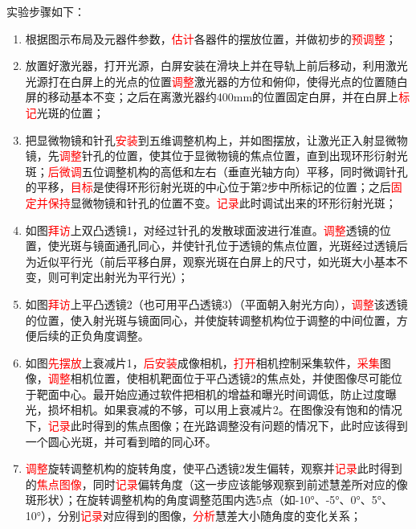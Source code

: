 \documentclass[dvipsnames, svgnames,a4paper,11pt]{article}
\begin{document}
	实验步骤如下：
	\begin{enumerate}
		\item 根据图示布局及元器件参数，\textcolor{red}{估计}各器件的摆放位置，并做初步的\textcolor{red}{预调整}；
		\item 放置好激光器，打开光源，白屏安装在滑块上并在导轨上前后移动，利用激光光源打在白屏上的光点的位置\textcolor{red}{调整}激光器的方位和俯仰，使得光点的位置随白屏的移动基本不变；之后在离激光器约400mm的位置固定白屏，并在白屏上\textcolor{red}{标记}光斑的位置；
		\item 	把显微物镜和针孔\textcolor{red}{安装}到五维调整机构上，并如图摆放，让激光正入射显微物镜，先\textcolor{red}{调整}针孔的位置，使其位于显微物镜的焦点位置，直到出现环形衍射光斑；\textcolor{red}{后微调}五位调整机构的高低和左右（垂直光轴方向）平移，同时微调针孔的平移，\textcolor{red}{目标}是使得环形衍射光斑的中心位于第2步中所标记的位置；之后\textcolor{red}{固定并保持}显微物镜和针孔的位置不变。\textcolor{red}{记录}此时调试出来的环形衍射光斑；
		\item 如图\textcolor{red}{拜访}上双凸透镜1，对经过针孔的发散球面波进行准直。\textcolor{red}{调整}透镜的位置，使光斑与镜面通孔同心，并使针孔位于透镜的焦点位置，光斑经过透镜后为近似平行光（前后平移白屏，观察光斑在白屏上的尺寸，如光斑大小基本不变，则可判定出射光为平行光）；
		\item 如图\textcolor{red}{拜访}上平凸透镜2（也可用平凸透镜3）（平面朝入射光方向），\textcolor{red}{调整}该透镜的位置，使入射光斑与镜面同心，并使旋转调整机构位于调整的中间位置，方便后续的正负角度调整。
		\item 如图\textcolor{red}{先摆放}上衰减片1，\textcolor{red}{后安装}成像相机，\textcolor{red}{打开}相机控制采集软件，\textcolor{red}{采集}图像，\textcolor{red}{调整}相机位置，使相机靶面位于平凸透镜2的焦点处，并使图像尽可能位于靶面中心。最开始应通过软件把相机的增益和曝光时间调低，防止过度曝光，损坏相机。如果衰减的不够，可以用上衰减片2。在图像没有饱和的情况下，\textcolor{red}{记录}此时得到的焦点图像；在光路调整没有问题的情况下，此时应该得到一个圆心光斑，并可看到暗的同心环。
		\item \textcolor{red}{调整}旋转调整机构的旋转角度，使平凸透镜2发生偏转，观察并\textcolor{red}{记录}此时得到的\textcolor{red}{焦点图像}，同时\textcolor{red}{记录}偏转角度（这一步应该能够观察到前述慧差所对应的像斑形状）；在旋转调整机构的角度调整范围内选5点（如-10°、-5°、0°、5°、10°），分别\textcolor{red}{记录}对应得到的图像，\textcolor{red}{分析}慧差大小随角度的变化关系；
	\end{enumerate}
\end{document}
